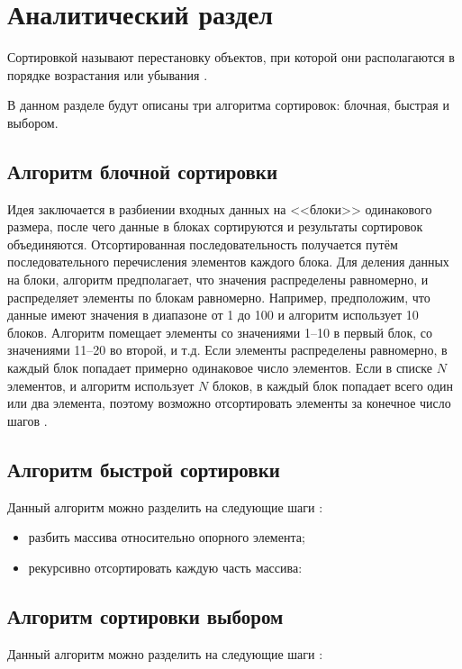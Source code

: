 \chapter{Аналитический раздел}

Сортировкой называют перестановку объектов, при которой они располагаются в порядке возрастания или убывания \cite{knut}.

В данном разделе будут описаны три алгоритма сортировок: блочная, быстрая и выбором.

\section{Алгоритм блочной сортировки}
Идея заключается в  разбиении входных данных на <<блоки>> одинакового размера, после чего данные в блоках сортируются и результаты сортировок объединяются.
Отсортированная последовательность получается путём последовательного перечисления элементов каждого блока.
Для деления данных на блоки, алгоритм предполагает, что значения распределены равномерно, и распределяет элементы по блокам равномерно. 
Например, предположим, что данные имеют значения в диапазоне от 1 до 100 и алгоритм использует 10 блоков. 
Алгоритм помещает элементы со значениями 1--10 в первый блок, со значениями 11--20  во второй, и т.д.
Если элементы распределены равномерно, в каждый блок попадает примерно одинаковое число элементов. 
Если в списке $N$ элементов, и алгоритм использует $N$ блоков, в каждый блок попадает всего один или два элемента, поэтому возможно отсортировать элементы за конечное число шагов \cite{article_sorts}.


\section{Алгоритм быстрой сортировки}
Данный алгоритм можно разделить на следующие шаги \cite{quicksort}:

\begin{itemize}
	\item разбить массива относительно опорного элемента;
	\item рекурсивно отсортировать каждую часть массива:
\end{itemize}


\section{Алгоритм сортировки выбором}
Данный алгоритм можно разделить на следующие шаги \cite{selectionsort}:

